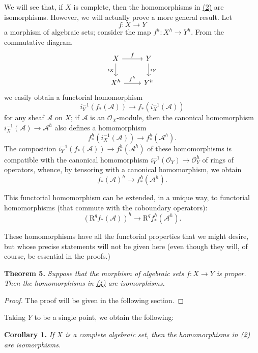 \documentclass{article}
\newenvironment{itenv}[1]
  {\smallskip\noindent\textbf{#1.}\itshape}
  {\smallskip}
\newcommand{\scr}[1]{{\mathscr{#1}}}
\newcommand{\RR}{\mathrm{R}}
\newcommand{\oldpage}[1]{\marginpar{\footnotesize$\Big\vert$ \textit{p.~#1}}}
\begin{document}
We will see that, if $X$ is complete, then the homomorphisms in \hyperref[equation2]{(2)} are isomorphisms.
However, we will actually prove a more general result.
Let
\[
  f\colon X\to Y
\]
\oldpage{2-09}
a morphism of algebraic sets;
consider the map $f^h\colon X^h\to Y^h$.
From the commutative diagram
\[
  \begin{tikzcd}
    X \ar[r,"f"] \ar[d,swap,"i_X"]
    & Y \ar[d,"i_Y"]
  \\X^h \ar[r,"f^h"]
    & Y^h
  \end{tikzcd}
\]
we easily obtain a functorial homomorphism
\[
  i_Y^{-1}(f_*(\scr{A})) \to f_*(i_X^{-1}(\scr{A}))
\]
for any sheaf $\scr{A}$ on $X$;
if $\scr{A}$ is an $\scr{O}_X$-module, then the canonical homomorphism $i_X^{-1}(\scr{A})\to\scr{A}^h$ also defines a homomorphism
\[
  f_*^h(i_X^{-1}(\scr{A})) \to f_*^h(\scr{A}^h).
\]
The composition $i_Y^{-1}(f_*(\scr{A}))\to f_*^h(\scr{A}^h)$ of these homomorphisms is compatible with the canonical homomorphism $i_Y^{-1}(\scr{O}_Y)\to\scr{O}_Y^h$ of rings of operators, whence, by tensoring with a canonical homomorphism, we obtain
\[
\label{equation3}
  f_*(\scr{A})^h \to f_*^h(\scr{A}^h).
  \tag{3}
\]

This functorial homomorphism can be extended, in a unique way, to functorial homomorphisms (that commute with the coboundary operators):
\[
\label{equation4}
  (\RR^qf_*(\scr{A}))^h \to \RR^qf_*^h(\scr{A}^h).
  \tag{4}
\]

These homomorphisms have all the functorial properties that we might desire, but whose precise statements will not be given here (even though they will, of course, be essential in the proofs.)

\begin{itenv}{Theorem 5}
\label{theorem5}
  Suppose that the morphism of algebraic sets $f\colon X\to Y$ is proper.
  Then the homomorphisms in \hyperref[equation4]{(4)} are isomorphisms.
\end{itenv}

\begin{proof}
  The proof will be given in the following section.
\end{proof}

Taking $Y$ to be a single point, we obtain the following:

\begin{itenv}{Corollary 1}
\label{corollary1-5}
  If $X$ is a complete algebraic set, then the homomorphisms in \hyperref[equation2]{(2)} are isomorphisms.
\end{itenv}
\end{document}
